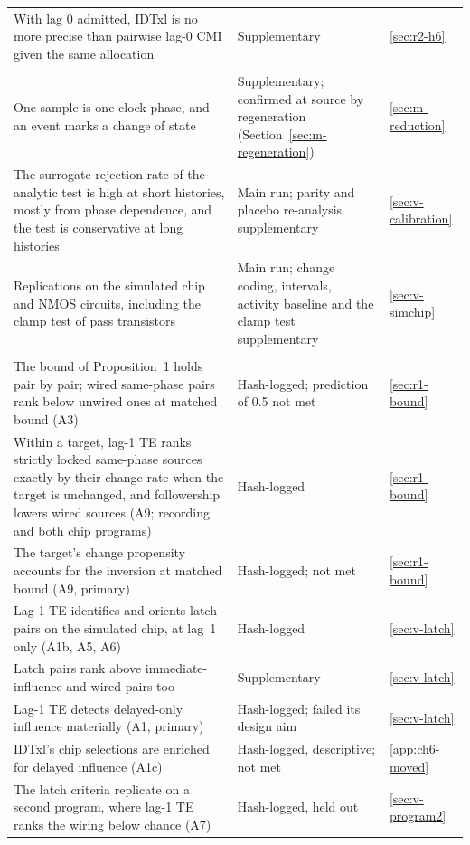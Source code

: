 {\begin{longtable}{@{}L{0.55\textwidth}L{0.28\textwidth}l@{}}
    With lag 0 admitted, IDTxl is no more precise than pairwise lag-0 CMI given the same allocation & Supplementary & \ref{sec:r2-h6} \\
    \addlinespace
     \\
    One sample is one clock phase, and an event marks a change of state & Supplementary; confirmed at source by regeneration (Section~\ref{sec:m-regeneration}) & \ref{sec:m-reduction} \\
    The surrogate rejection rate of the analytic test is high at short histories, mostly from phase dependence, and the test is conservative at long histories & Main run; parity and placebo re-analysis supplementary & \ref{sec:v-calibration} \\
    Replications on the simulated chip and NMOS circuits, including the clamp test of pass transistors & Main run; change coding, intervals, activity baseline and the clamp test supplementary & \ref{sec:v-simchip} \\
    \addlinespace
     \\
    The bound of Proposition~1 holds pair by pair; wired same-phase pairs rank below unwired ones at matched bound (A3) & Hash-logged; prediction of 0.5 not met & \ref{sec:r1-bound} \\
    Within a target, lag-1 TE ranks strictly locked same-phase sources exactly by their change rate when the target is unchanged, and followership lowers wired sources (A9; recording and both chip programs) & Hash-logged & \ref{sec:r1-bound} \\
    The target's change propensity accounts for the inversion at matched bound (A9, primary) & Hash-logged; not met & \ref{sec:r1-bound} \\
    Lag-1 TE identifies and orients latch pairs on the simulated chip, at lag~1 only (A1b, A5, A6) & Hash-logged & \ref{sec:v-latch} \\
    Latch pairs rank above immediate-influence and wired pairs too & Supplementary & \ref{sec:v-latch} \\
    Lag-1 TE detects delayed-only influence materially (A1, primary) & Hash-logged; failed its design aim & \ref{sec:v-latch} \\
    IDTxl's chip selections are enriched for delayed influence (A1c) & Hash-logged, descriptive; not met & \ref{app:ch6-moved} \\
    The latch criteria replicate on a second program, where lag-1 TE ranks the wiring below chance (A7) & Hash-logged, held out & \ref{sec:v-program2} \\

\end{longtable}}

